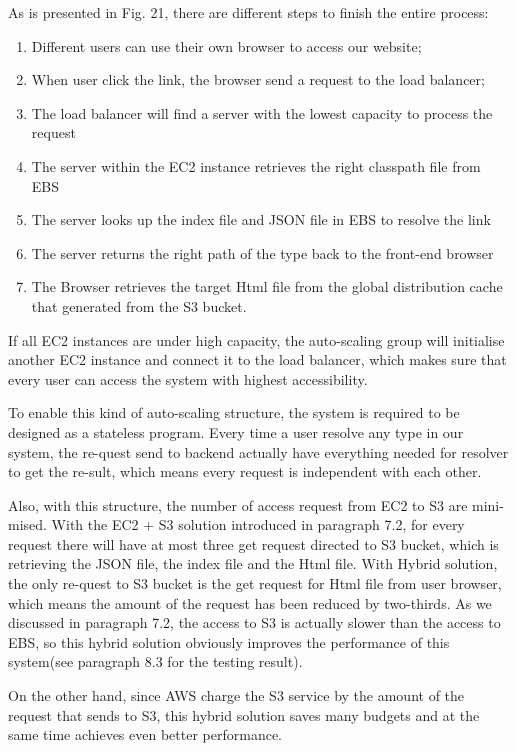 \documentclass[runningheads]{llncs}
\begin{document}
As is presented in Fig. 21, there are different steps to finish the entire process:

\begin{enumerate}
	\item Different users can use their own browser to access our website;
	\item When user click the link, the browser send a request to the load balancer;
	\item The load balancer will find a server with the lowest capacity to process the request
	\item The server within the EC2 instance retrieves the right classpath file from EBS
	\item The server looks up the index file and JSON file in EBS to resolve the link
	\item The server returns the right path of the type back to the front-end browser
	\item The Browser retrieves the target Html file from the global distribution cache that generated from the S3 bucket.

\end{enumerate}

If all EC2 instances are under high capacity, the auto-scaling group will initialise another EC2 instance and connect it to the load balancer, which makes sure that every user can access the system with highest accessibility.

To enable this kind of auto-scaling structure, the system is required to be designed as a stateless program. Every time a user resolve any type in our system, the re-quest send to backend actually have everything needed for resolver to get the re-sult, which means every request is independent with each other.

Also, with this structure, the number of access request from EC2 to S3 are mini-mised. With the EC2 + S3 solution introduced in paragraph 7.2, for every request there will have at most three get request directed to S3 bucket, which is retrieving the JSON file, the index file and the Html file. With Hybrid solution, the only re-quest to S3 bucket is the get request for Html file from user browser, which means the amount of the request has been reduced by two-thirds. As we discussed in paragraph 7.2, the access to S3 is actually slower than the access to EBS, so this hybrid solution obviously improves the performance of this system(see paragraph 8.3 for the testing result).

On the other hand, since AWS charge the S3 service by the amount of the request that sends to S3, this hybrid solution saves many budgets and at the same time achieves even better performance.
\end{document}
